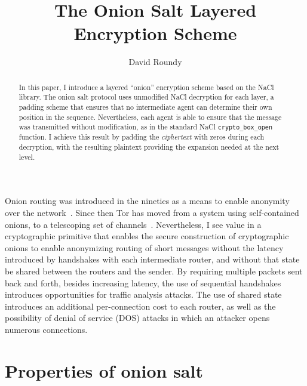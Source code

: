 \documentclass[letterpaper,twocolumn,amsmath,amssymb,pre,aps,10pt]{revtex4-1}
\begin{document}
\title{The Onion Salt Layered Encryption Scheme}
\author{David Roundy}

\begin{abstract}
  In this paper, I introduce a layered ``onion'' encryption scheme
  based on the NaCl library.  The onion salt protocol uses unmodified
  NaCl decryption for each layer, a padding scheme that ensures that
  no intermediate agent can determine their own position in the
  sequence.  Nevertheless, each agent is able to ensure that the
  message was transmitted without modification, as in the standard
  NaCl \verb!crypto_box_open! function.  I achieve this result by
  padding the \emph{ciphertext} with zeros during each decryption,
  with the resulting plaintext providing the expansion needed at the
  next level.
\end{abstract}

\maketitle

Onion routing was introduced in the nineties as a means to enable
anonymity over the network~\cite{reed1998onionrouting}.  Since then
Tor has moved from a system using self-contained onions, to a
telescoping set of channels~\cite{dingledine2004tor}.  Nevertheless, I
see value in a cryptographic primitive that enables the secure
construction of cryptographic onions to enable anonymizing routing of
short messages without the latency introduced by handshakes with each
intermediate router, and without that state be shared between the
routers and the sender.  By requiring multiple packets sent back and
forth, besides increasing latency, the use of sequential handshakes
introduces opportunities for traffic analysis attacks.  The use of
shared state introduces an additional per-connection cost to each
router, as well as the possibility of denial of service (DOS) attacks
in which an attacker opens numerous connections.

\newcommand\Nrouter{\ensuremath{N_{\text{router}}}}

\section{Properties of onion salt}
\end{document}
